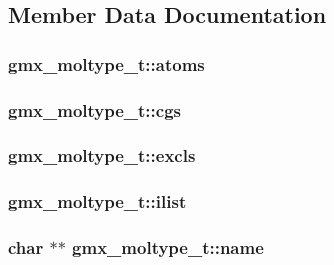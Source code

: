 \subsection{\-Member \-Data \-Documentation}
\hypertarget{structgmx__moltype__t_af760b3a13193bf60232fae7b1b97281c}{
\subsubsection[{atoms}]{ {\bf gmx\-\_\-moltype\-\_\-t\-::atoms}}}\label{structgmx__moltype__t_af760b3a13193bf60232fae7b1b97281c}
\hypertarget{structgmx__moltype__t_ae75f4e5900d9d97ca036b7c3b55bc505}{
\subsubsection[{cgs}]{ {\bf gmx\-\_\-moltype\-\_\-t\-::cgs}}}\label{structgmx__moltype__t_ae75f4e5900d9d97ca036b7c3b55bc505}
\hypertarget{structgmx__moltype__t_ab8681cd30bf9c5af7bd5267d4b7fbe78}{
\subsubsection[{excls}]{ {\bf gmx\-\_\-moltype\-\_\-t\-::excls}}}\label{structgmx__moltype__t_ab8681cd30bf9c5af7bd5267d4b7fbe78}
\hypertarget{structgmx__moltype__t_ae02d80885f5466e4190b119871bf6965}{
\subsubsection[{ilist}]{ {\bf gmx\-\_\-moltype\-\_\-t\-::ilist}}}\label{structgmx__moltype__t_ae02d80885f5466e4190b119871bf6965}
\hypertarget{structgmx__moltype__t_ae95e62eef8f13cc4eda411d09f8b3bf1}{
\subsubsection[{name}]{\setlength{\rightskip}{0pt plus 5cm}char $\ast$$\ast$ {\bf gmx\-\_\-moltype\-\_\-t\-::name}}}\label{structgmx__moltype__t_ae95e62eef8f13cc4eda411d09f8b3bf1}


